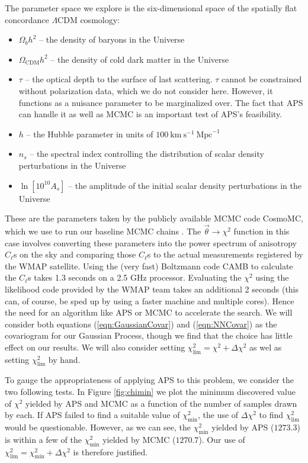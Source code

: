 \documentclass[useAMS,usenatbib]{aastex}
\begin{document}
The parameter space we explore is the six-dimensional space of the spatially
flat concordance $\Lambda$CDM cosmology:
\begin{itemize}
\item$\Omega_bh^2$ -- the density of baryons in the Universe
\\
\item$\Omega_\text{CDM}h^2$ -- the density of cold dark matter in the Universe
\\
\item$\tau$ -- the optical depth to the surface of last scattering.  $\tau$ cannot be
constrained without polarization data, which we do not consider here.  However, it functions
as a nuisance parameter to be marginalized over.  The fact that APS can handle it as well as
MCMC is an important test of APS's feasibility.
\\
\item$h$ -- the Hubble parameter in units of
$100~\text{km}~\text{s}^{-1}~\text{Mpc}^{-1}$
\\
\item$n_s$ -- the spectral index controlling the distribution of scalar density
perturbations in the Universe
\\
\item$\ln[10^{10}A_s]$ -- the amplitude of the initial scalar density
perturbations in the Universe
\end{itemize}
These are the parameters taken by the publicly available MCMC code CosmoMC,
which we use to run our baseline MCMC chains \cite{cosmomc}.  The
$\vec{\theta}\rightarrow\chi^2$ function in this case involves converting these
parameters into the power spectrum of anisotropy $C_\ell$s on the sky and
comparing those $C_\ell$s to the actual measurements registered by the WMAP
satellite.  Using the (very fast) Boltzmann code CAMB to calculate the $C_\ell$s
\cite{camb} takes 1.3 seconds on a 2.5 GHz processor.  
Evaluating the $\chi^2$ using the likelihood code provided by the WMAP team
\cite{wmap7likelihood} takes an additional 2 seconds (this can, of course, be sped up by using a faster
machine and multiple cores).  Hence the need
for an algorithm like APS or MCMC to accelerate the search.
We will consider both equations (\ref{eqn:GaussianCovar}) and (\ref{eqn:NNCovar})
as the covariogram for our Gaussian Process, 
though we find that the choice has little effect on our
results.  We will also consider setting $\chi^2_\text{lim}=\chi^2+\Delta\chi^2$ 
as wel as setting $\chi^2_\text{lim}$ by hand.

To gauge the appropriateness of applying APS to this problem, we consider
the two following tests.  In Figure \ref{fig:chimin} we plot the minimum discovered value
of $\chi^2$ yielded by APS and MCMC as a function of the number of samples drawn
by each.  If APS failed to find a suitable value of $\chi^2_\text{min}$, the use of
$\Delta\chi^2$  to find $\chi^2_\text{lim}$ would be questionable.  However, as we can see,
the $\chi^2_\text{min}$ yielded by APS ($1273.3$) 
is within a few of the $\chi^2_\text{min}$ yielded
by MCMC ($1270.7$).  Our use of $\chi^2_\text{lim}=\chi^2_\text{min}+\Delta\chi^2$ is therefore
justified.
\end{document}
